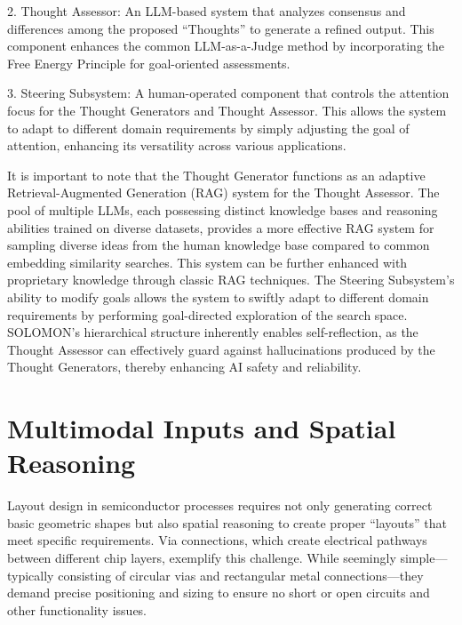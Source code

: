 \documentclass{article}
\begin{document}
2. Thought Assessor: An LLM-based system that analyzes consensus and differences among the proposed ``Thoughts'' to generate a refined output. This component enhances the common LLM-as-a-Judge method \cite{zheng2023judgingllmasajudgemtbenchchatbot, guerreiro2023lookingneedlehaystackcomprehensive, lin2023llmevalunifiedmultidimensionalautomatic, ji2023mitigatinghallucinationlargelanguage} by incorporating the Free Energy Principle for goal-oriented assessments.

3. Steering Subsystem: A human-operated component that controls the attention focus for the Thought Generators and Thought Assessor. This allows the system to adapt to different domain requirements by simply adjusting the goal of attention, enhancing its versatility across various applications.

It is important to note that the Thought Generator functions as an adaptive Retrieval-Augmented Generation (RAG) system for the Thought Assessor. The pool of multiple LLMs, each possessing distinct knowledge bases and reasoning abilities trained on diverse datasets, provides a more effective RAG system for sampling diverse ideas from the human knowledge base compared to common embedding similarity searches. This system can be further enhanced with proprietary knowledge through classic RAG techniques. The Steering Subsystem's ability to modify goals allows the system to swiftly adapt to different domain requirements by performing goal-directed exploration of the search space. SOLOMON's hierarchical structure inherently enables self-reflection, as the Thought Assessor can effectively guard against hallucinations produced by the Thought Generators, thereby enhancing AI safety and reliability.

\section{Multimodal Inputs and Spatial Reasoning}
Layout design in semiconductor processes requires not only generating correct basic geometric shapes but also spatial reasoning to create proper ``layouts'' that meet specific requirements. Via connections, which create electrical pathways between different chip layers, exemplify this challenge. While seemingly simple—typically consisting of circular vias and rectangular metal connections—they demand precise positioning and sizing to ensure no short or open circuits and other functionality issues.
\end{document}
